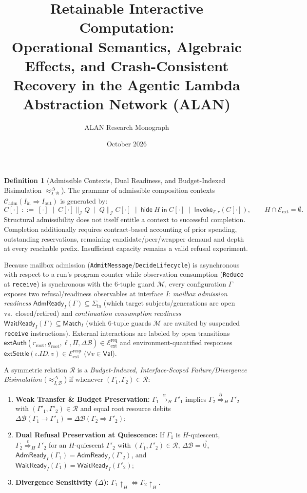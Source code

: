 \documentclass[11pt,a4paper]{article}
\title{\textbf{Retainable Interactive Computation:\\Operational Semantics, Algebraic Effects, and Crash-Consistent Recovery in the Agentic Lambda Abstraction Network (ALAN)}}
\author{ALAN Research Monograph}
\date{October 2026}
\theoremstyle{definition}
\newtheorem{definition}[theorem]{Definition}
\theoremstyle{remark}
\newcommand{\Val}{\mathsf{Val}}
\begin{document}
\begin{definition}[Admissible Contexts, Dual Readiness, and Budget-Indexed Bisimulation $\approx^{\Delta}_{I,\mathcal{B}}$]
The grammar of admissible composition contexts $\mathcal{C}_{\text{adm}}(I_{\text{in}} \Rightarrow I_{\text{out}})$ is generated by:
\[
  C[\cdot] \;::=\; [\cdot] \;\mid\; C[\cdot] \parallel_{\mathcal{I}} Q \;\mid\; Q \parallel_{\mathcal{I}} C[\cdot] \;\mid\; \mathsf{hide}\; H \;\mathsf{in}\; C[\cdot] \;\mid\; \mathsf{Invoke}_{T,r}(C[\cdot]), \qquad H \cap \mathcal{E}_{\text{ext}} = \emptyset.
\]
Structural admissibility does not itself entitle a context to successful completion. Completion additionally requires contract-based accounting of prior spending, outstanding reservations, remaining candidate/peer/wrapper demand and depth at every reachable prefix. Insufficient capacity remains a valid refusal experiment.

Because mailbox admission (\texttt{AdmitMessage}/\texttt{DecideLifecycle}) is asynchronous with respect to a run's program counter while observation consumption (\texttt{Reduce} at \texttt{receive}) is synchronous with the 6-tuple guard $\mathcal{M}$, every configuration $\Gamma$ exposes two refusal/readiness observables at interface $I$: \emph{mailbox admission readiness} $\mathsf{AdmReady}_I(\Gamma) \subseteq \Sigma_{\text{in}}$ (which target subjects/generations are open vs.\ closed/retired) and \emph{continuation consumption readiness} $\mathsf{WaitReady}_I(\Gamma) \subseteq \mathsf{Match}_I$ (which 6-tuple guards $\mathcal{M}$ are awaited by suspended \texttt{receive} instructions). External interactions are labeled by open transitions $\mathsf{extAuth}(r_{\text{root}}, g_{\text{root}}, \ell, \Pi, \Delta\mathcal{B}) \in \mathcal{E}_{\text{ext}}^{\text{req}}$ and environment-quantified responses $\mathsf{extSettle}(\iota.\mathit{ID}, v) \in \mathcal{E}_{\text{ext}}^{\text{resp}}$ ($\forall v \in \Val$).

A symmetric relation $\mathcal{R}$ is a \emph{Budget-Indexed, Interface-Scoped Failure/Divergence Bisimulation} ($\approx^{\Delta}_{I,\mathcal{B}}$) if whenever $(\Gamma_1, \Gamma_2) \in \mathcal{R}$:
\begin{enumerate}
  \item \textbf{Weak Transfer \& Budget Preservation:} $\Gamma_1 \xrightarrow{\alpha}_H \Gamma'_1$ implies $\Gamma_2 \stackrel{\hat{\alpha}}{\Longrightarrow}_H \Gamma'_2$ with $(\Gamma'_1, \Gamma'_2) \in \mathcal{R}$ and equal root resource debits $\Delta\mathcal{B}(\Gamma_1 \to \Gamma'_1) = \Delta\mathcal{B}(\Gamma_2 \Rightarrow \Gamma'_2)$;
  \item \textbf{Dual Refusal Preservation at Quiescence:} If $\Gamma_1$ is $H$-quiescent, $\Gamma_2 \stackrel{\epsilon}{\Longrightarrow}_H \Gamma'_2$ for an $H$-quiescent $\Gamma'_2$ with $(\Gamma_1, \Gamma'_2) \in \mathcal{R}$, $\Delta\mathcal{B} = \vec{0}$, $\mathsf{AdmReady}_I(\Gamma_1) = \mathsf{AdmReady}_I(\Gamma'_2)$, and $\mathsf{WaitReady}_I(\Gamma_1) = \mathsf{WaitReady}_I(\Gamma'_2)$;
  \item \textbf{Divergence Sensitivity ($\Delta$):} $\Gamma_1 \uparrow_H \iff \Gamma_2 \uparrow_H$.
\end{enumerate}
\end{definition}
\end{document}
